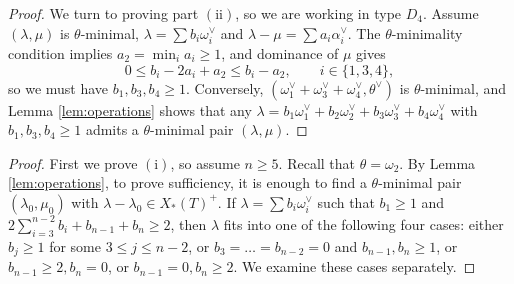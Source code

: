 \documentclass[a4paper, 12pt]{amsart}
\theoremstyle{definition}
\begin{document}
\begin{proof}
We turn to proving part $(\mathrm{ii})$, so we are working in type $D_4$. Assume $(\lambda,\mu)$ is $\theta$-minimal, $\lambda= \sum b_i \omega_i^\vee$ and $\lambda-\mu= \sum a_i \alpha_i^\vee$. The $\theta$-minimality condition implies $a_2=\min_i a_i\ge1$, and dominance of $\mu$ gives
\[
0\le b_i-2a_i+a_2\le b_i-a_2, \qquad i\in\{1,3,4\},
\]
so we must have $b_1,b_3,b_4\ge1$. Conversely, $(\omega_1^\vee+\omega_3^\vee+\omega_4^\vee, \theta^\vee)$ is $\theta$-minimal, and Lemma \ref{lem:operations} shows that any $\lambda= b_1\omega_1^\vee+b_2\omega_2^\vee+b_3 \omega_3^\vee+b_4\omega_4^\vee$ with $b_1, b_3, b_4 \geq 1$ admits a $\theta$-minimal pair $(\lambda, \mu)$.
\end{proof}

\iffalse
\begin{proof}
First we prove $(\mathrm{i})$, so assume $n \geq 5$. Recall that $\theta = \omega_2$. By Lemma \ref{lem:operations}, to prove sufficiency, it is enough to find a $\theta$-minimal pair $(\lambda_0, \mu_0)$ with $\lambda- \lambda_0 \in X_*(T)^+$. If $\lambda= \sum b_i \omega_i^\vee$ such that $b_1 \geq 1$ and $2 \sum_{i=3}^{n-2}b_i + b_{n-1} +b_{n} \geq 2$, then $\lambda$ fits into one of the following four cases: either $b_j \geq 1$ for some $3 \leq j \leq n-2$, or $b_3 = \dots =b_{n-2}=0$ and $b_{n-1}, b_{n} \geq 1$, or $b_{n-1} \geq 2, b_n=0$, or $b_{n-1}=0, b_{n} \geq 2$. We examine these cases separately.


\end{proof}
\end{document}

